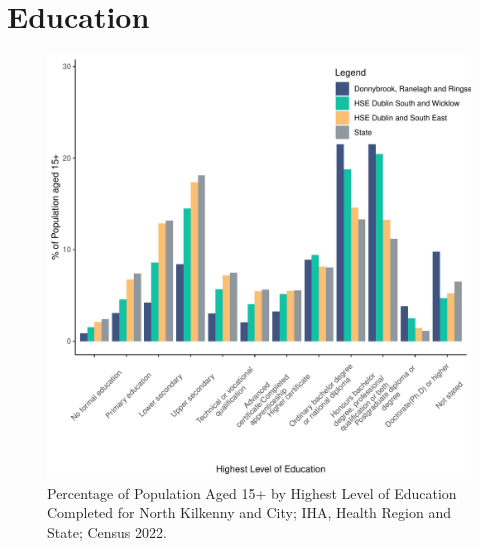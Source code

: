 \documentclass{article}
\begin{document}
\section{Education}\label{sect:Edu}
\begin{figure}[H]
	\centering
	\includegraphics[width = 120mm]{../figures/EduED.pdf}
	\caption{Percentage of Population Aged 15+ by Highest Level of Education Completed for North Kilkenny and City; IHA, Health Region and State; Census 2022.}
	\label{fig:vbnv}
	\end{figure}
\end{document}
